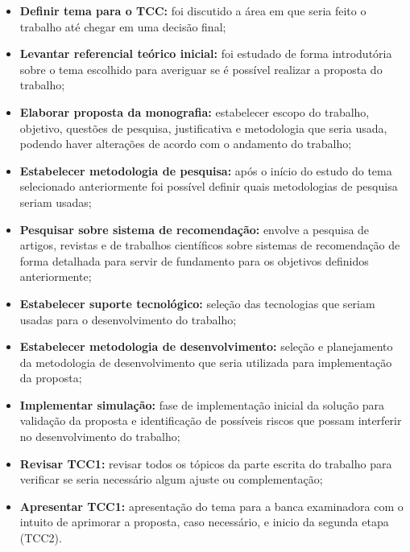 \begin{itemize}
    \item \textbf{Definir tema para o TCC:} foi discutido a área em que seria feito o trabalho até chegar em uma decisão final;

    \item \textbf{Levantar referencial teórico inicial:} foi estudado de forma introdutória sobre o tema escolhido para averiguar se é possível realizar a proposta do trabalho;

    \item \textbf{Elaborar proposta da monografia:} estabelecer escopo do trabalho, objetivo, questões de pesquisa, justificativa e metodologia que seria usada, podendo haver alterações de acordo com o andamento do trabalho;

    \item \textbf{Estabelecer metodologia de pesquisa:} após o início do estudo do tema selecionado anteriormente foi possível definir quais metodologias de pesquisa seriam usadas;

    \item \textbf{Pesquisar sobre sistema de recomendação:} envolve a pesquisa de artigos, revistas e de trabalhos científicos sobre sistemas de recomendação de forma detalhada para servir de fundamento para os objetivos definidos anteriormente;

    \item \textbf{Estabelecer suporte tecnológico:} seleção das tecnologias que seriam usadas para o desenvolvimento do trabalho;

    \item \textbf{Estabelecer metodologia de desenvolvimento:} seleção e planejamento da metodologia de desenvolvimento que seria utilizada para implementação da proposta;

    \item \textbf{Implementar simulação:} fase de implementação inicial da solução para validação da proposta e identificação de possíveis riscos que possam interferir no desenvolvimento do trabalho;

    \item \textbf{Revisar TCC1:} revisar todos os tópicos da parte escrita do trabalho para verificar se seria necessário algum ajuste ou complementação;

    \item \textbf{Apresentar TCC1:} apresentação do tema para a banca examinadora com o intuito de aprimorar a proposta, caso necessário, e inicio da segunda etapa (TCC2).

\end{itemize}

